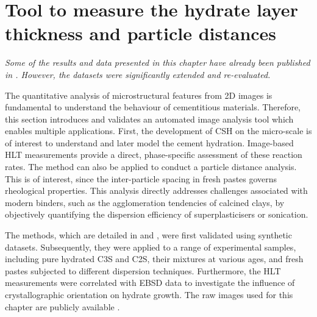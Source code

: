 \FloatBarrier
\newpage
\section{Tool to measure the hydrate layer thickness and particle distances}
\label{chap:hydrate-rim}

\textit{Some of the results and data presented in this chapter have already been published in \cite{kleiner.2024a,kleiner.2026b}. However, the datasets were significantly extended and re-evaluated.}

The quantitative analysis of microstructural features from 2D images is fundamental to understand the behaviour of cementitious materials.
Therefore, this section introduces and validates an automated image analysis tool which enables multiple applications.
First, the development of \ac{CSH} on the micro-scale is of interest to understand and later model the cement hydration.
Image-based \ac{HLT} measurements provide a direct, phase-specific assessment of these reaction rates.
The method can also be applied to conduct a particle distance analysis.
This is of interest, since the inter-particle spacing in fresh pastes governs rheological properties.
This analysis directly addresses challenges associated with modern binders, such as the agglomeration tendencies of calcined clays, by objectively quantifying the dispersion efficiency of superplasticisers or sonication.

The methods, which are detailed in  and , were first validated using synthetic datasets.
Subsequently, they were applied to a range of experimental samples, including pure hydrated \ac{C3S} and \ac{C2S}, their mixtures at various ages, and fresh pastes subjected to different dispersion techniques.
Furthermore, the \ac{HLT} measurements were correlated with \ac{EBSD} data to investigate the influence of crystallographic orientation on hydrate growth.
The raw images used for this chapter are publicly available \cite{kleiner.2023a, kleiner.2025e, kleiner.2025d, kleiner.2026a}.
